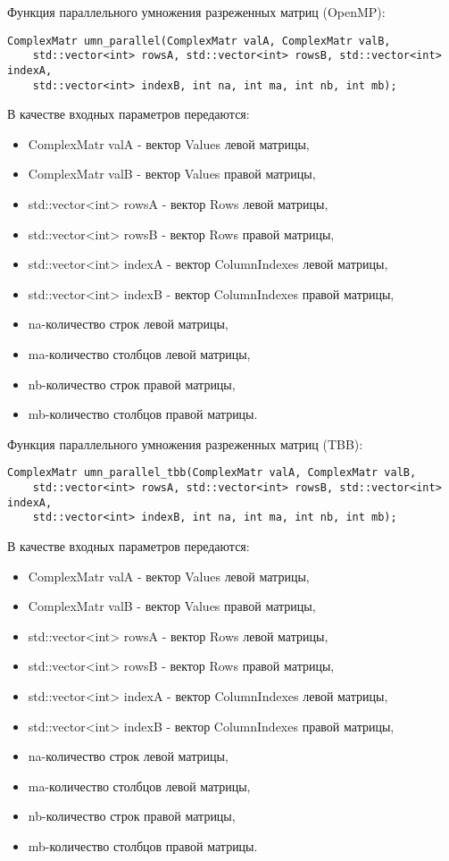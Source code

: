 \documentclass{report}
\begin{document}
\par Функция параллельного умножения разреженных матриц (OpenMP):
\begin{lstlisting}
ComplexMatr umn_parallel(ComplexMatr valA, ComplexMatr valB,
    std::vector<int> rowsA, std::vector<int> rowsB, std::vector<int> indexA,
    std::vector<int> indexB, int na, int ma, int nb, int mb);
\end{lstlisting}
\par В качестве входных параметров передаются:
\begin{itemize}
\item ComplexMatr valA - вектор Values левой матрицы,
\item ComplexMatr valB - вектор Values правой матрицы,
\item std::vector<int> rowsA - вектор Rows левой матрицы,
\item std::vector<int> rowsB - вектор Rows правой матрицы,
\item std::vector<int> indexA - вектор ColumnIndexes левой матрицы,
\item std::vector<int> indexB - вектор ColumnIndexes правой матрицы,
\item na-количество строк левой матрицы,
\item ma-количество столбцов левой матрицы,
\item nb-количество строк правой матрицы,
\item mb-количество столбцов правой матрицы.
\end{itemize}
\par Функция параллельного умножения разреженных матриц (TBB):
\begin{lstlisting}
ComplexMatr umn_parallel_tbb(ComplexMatr valA, ComplexMatr valB,
    std::vector<int> rowsA, std::vector<int> rowsB, std::vector<int> indexA,
    std::vector<int> indexB, int na, int ma, int nb, int mb);
\end{lstlisting}
\par В качестве входных параметров передаются:
\begin{itemize}
\item ComplexMatr valA - вектор Values левой матрицы,
\item ComplexMatr valB - вектор Values правой матрицы,
\item std::vector<int> rowsA - вектор Rows левой матрицы,
\item std::vector<int> rowsB - вектор Rows правой матрицы,
\item std::vector<int> indexA - вектор ColumnIndexes левой матрицы,
\item std::vector<int> indexB - вектор ColumnIndexes правой матрицы,
\item na-количество строк левой матрицы,
\item ma-количество столбцов левой матрицы,
\item nb-количество строк правой матрицы,
\item mb-количество столбцов правой матрицы.
\end{itemize}
\newpage
\end{document}
